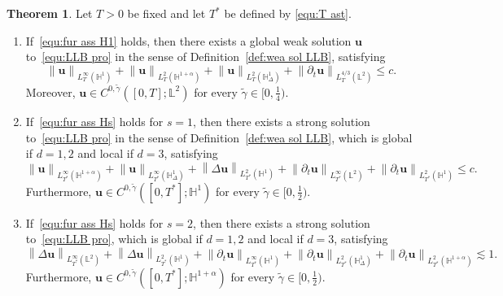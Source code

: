 \documentclass[11pt,reqno]{amsart}
\theoremstyle{definition}
\newtheorem{theorem}{Theorem}[section]
\numberwithin{equation}{section}
\newcommand{\bff}{\boldsymbol}
\newcommand{\bb}{\mathbb}
\newcommand{\leqs}{\lesssim}
\newcommand{\pa}{\partial}
\newcommand{\norm}[2]{\left\|{#1}\right\|_{#2}}
\begin{document}
\begin{theorem}\label{the:con u eps}
Let $T>0$ be fixed and let $T^\ast$ be defined by \eqref{equ:T ast}.
	\begin{enumerate}
		\renewcommand{\labelenumi}{\theenumi}
		\renewcommand{\theenumi}{{\rm (\roman{enumi})}}
		\item 
		If~\eqref{equ:fur ass H1} holds, then there exists
		a global weak solution $\bff{u}$ to~\eqref{equ:LLB pro} in the sense of Definition~\ref{def:wea sol LLB}, satisfying
        \begin{equation}\label{equ:u H1 summ}
				\norm{\bff{u}}{L^\infty_T(\bb{H}^1)}
				+
				\norm{\bff{u}}{L^2_T(\bb{H}^{1+\alpha})}
				+
				\norm{\bff{u}}{L^2_T(\bb{H}^1_\Delta)}
				+
				\norm{\pa_t \bff{u}}{L^{4/3}_T(\bb{L}^2)}
				\leq c.
		\end{equation}
        Moreover, $\bff{u}\in C^{0,\widetilde{\gamma}}([0,T]; \bb{L}^2)$ for every $\widetilde{\gamma}\in [0,\frac14)$.
		\item 
		If~\eqref{equ:fur ass Hs} holds for $s=1$, then there exists a strong solution to~\eqref{equ:LLB pro} in the sense of Definition~\ref{def:wea sol LLB}, which is global if $d=1,2$ and local if $d=3$, satisfying 
        \begin{equation}\label{equ:u H2 summary}
			\norm{\bff{u}}{L^\infty_{T^\ast}(\bb{H}^{1+\alpha})}
			+
			\norm{\bff{u}}{L^\infty_{T^\ast}(\bb{H}^1_\Delta)}
			+
			\norm{\Delta \bff{u}}{L^2_{T^\ast}(\bb{H}^1)}
			+
			\norm{\pa_t\bff{u}}{L^\infty_{T^\ast}(\bb{L}^2)}
			+
			\norm{\pa_t\bff{u}}{L^2_{T^\ast}(\bb{H}^1)}
			\leq c.
		\end{equation}
        Furthermore, $\bff{u}\in C^{0,\widetilde{\gamma}}([0,T^\ast]; \bb{H}^1)$ for every $\widetilde{\gamma}\in [0,\frac12)$.
        	\item 
        If~\eqref{equ:fur ass Hs} holds for $s=2$, then there exists a strong solution to~\eqref{equ:LLB pro}, which is global if $d=1,2$ and local if $d=3$, satisfying 
        \begin{equation}\label{equ:u H3 summary}
        	\norm{\Delta \bff{u}}{L^\infty_{T^\ast}(\bb{L}^2)}
        	+
        	\norm{\Delta \bff{u}}{L^2_{T^\ast}(\bb{H}^1)}
        	+
        	\norm{\pa_t\bff{u}}{L^\infty_{T^\ast}(\bb{H}^1)}
        	+
        	\norm{\pa_t\bff{u}}{L^2_{T^\ast}(\bb{H}^1_\Delta)}
        	+
        	\norm{\pa_t\bff{u}}{L^2_{T^\ast}(\bb{H}^{1+\alpha})}
        	\leqs 1.
        \end{equation}
        Furthermore, $\bff{u}\in C^{0,\widetilde{\gamma}}([0,T^\ast]; \bb{H}^{1+\alpha})$ for every $\widetilde{\gamma}\in [0,\frac12)$.
	\end{enumerate}
\end{theorem}
\end{document}

